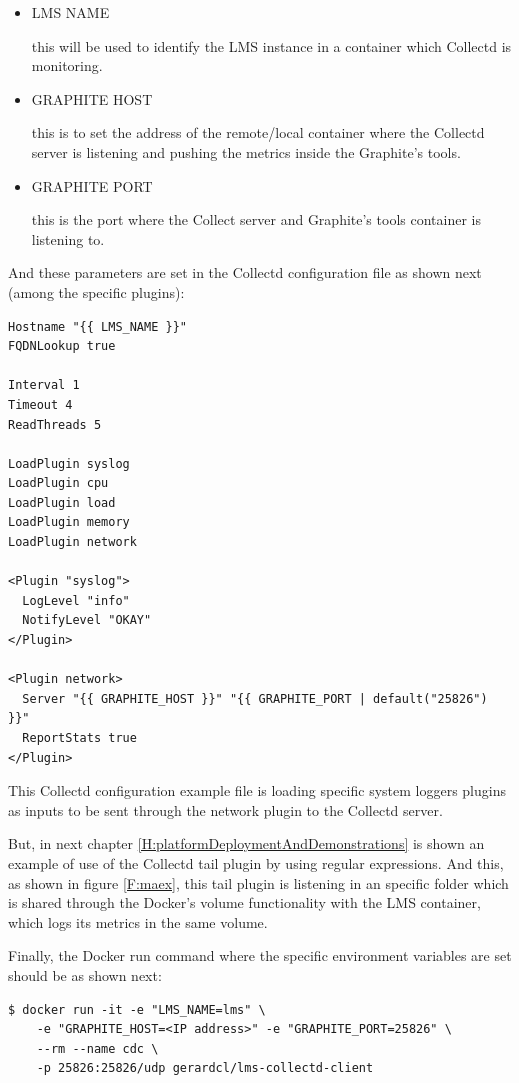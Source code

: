 \begin{itemize}
\item LMS NAME \hfill

this will be used to identify the LMS instance in a container which Collectd is monitoring.
\item GRAPHITE HOST \hfill

this is to set the address of the remote/local container where the Collectd server is listening and pushing the metrics inside the Graphite's tools.
\item GRAPHITE PORT \hfill

this is the port where the Collect server and Graphite's tools container is listening to.
\end{itemize}

And these parameters are set in the Collectd configuration file as shown next (among the specific plugins):

\begin{verbatim}
Hostname "{{ LMS_NAME }}"
FQDNLookup true

Interval 1
Timeout 4
ReadThreads 5

LoadPlugin syslog
LoadPlugin cpu
LoadPlugin load
LoadPlugin memory
LoadPlugin network

<Plugin "syslog">
  LogLevel "info"
  NotifyLevel "OKAY"
</Plugin>

<Plugin network>
  Server "{{ GRAPHITE_HOST }}" "{{ GRAPHITE_PORT | default("25826") }}"
  ReportStats true
</Plugin>
\end{verbatim}

This Collectd configuration example file is loading specific system loggers plugins as inputs to be sent through the network plugin to the Collectd server.

But, in next chapter \ref{H:platformDeploymentAndDemonstrations} is shown an example of use of the Collectd tail plugin by using regular expressions. And this, as shown in figure \ref{F:maex}, this tail plugin is listening in an specific folder which is shared through the Docker's volume functionality with the LMS container, which logs its metrics in the same volume.

Finally, the Docker run command where the specific environment variables are set should be as shown next:
\begin{verbatim}
$ docker run -it -e "LMS_NAME=lms" \
	-e "GRAPHITE_HOST=<IP address>" -e "GRAPHITE_PORT=25826" \
	--rm --name cdc \
	-p 25826:25826/udp gerardcl/lms-collectd-client
\end{verbatim}

